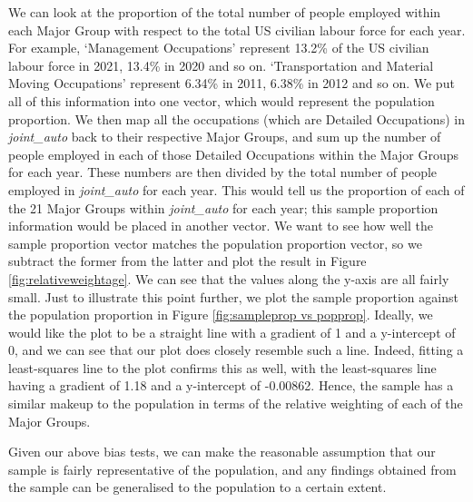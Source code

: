 \documentclass[11pt]{article}
\begin{document}
We can look at the proportion of the total number of people employed within each Major Group with respect to the total US civilian labour force for each year. For example, `Management Occupations' represent 13.2\% of the US civilian labour force in 2021, 13.4\% in 2020 and so on. `Transportation and Material Moving Occupations' represent 6.34\% in 2011, 6.38\% in 2012 and so on. We put all of this information into one vector, which would represent the population proportion. We then map all the occupations (which are Detailed Occupations) in \emph{joint\_auto} back to their respective Major Groups, and sum up the number of people employed in each of those Detailed Occupations within the Major Groups for each year. These numbers are then divided by the total number of people employed in \emph{joint\_auto} for each year. This would tell us the proportion of each of the 21 Major Groups within \emph{joint\_auto} for each year; this sample proportion information would be placed in another vector. We want to see how well the sample proportion vector matches the population proportion vector, so we subtract the former from the latter and plot the result in Figure \ref{fig:relativeweightage}. We can see that the values along the y-axis are all fairly small. Just to illustrate this point further, we plot the sample proportion against the population proportion in Figure \ref{fig:sampleprop vs popprop}. Ideally, we would like the plot to be a straight line with a gradient of 1 and a y-intercept of 0, and we can see that our plot does closely resemble such a line. Indeed, fitting a least-squares line to the plot confirms this as well, with the least-squares line having a gradient of 1.18 and a y-intercept of -0.00862. Hence, the sample has a similar makeup to the population in terms of the relative weighting of each of the Major Groups.

Given our above bias tests, we can make the reasonable assumption that our sample is fairly representative of the population, and any findings obtained from the sample can be generalised to the population to a certain extent.
\end{document}
